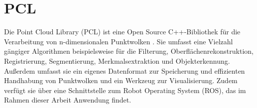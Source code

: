 \section[PCL (Schmelzer)]{PCL}

Die Point Cloud Library (PCL) ist eine Open Source C++-Bibliothek für die Verarbeitung von n-dimensionalen Punktwolken \cite{PCL2020}. Sie umfasst eine Vielzahl gängiger Algorithmen beispielsweise für die Filterung, Oberflächenrekonstruktion, Registrierung, Segmentierung, Merkmalsextraktion und Objekterkennung. Außerdem umfasst sie ein eigenes Datenformat zur Speicherung und effizienten Handhabung von Punktwolken und ein Werkzeug zur Visualisierung. Zudem verfügt sie über eine Schnittstelle zum Robot Operating System (ROS), das im Rahmen dieser Arbeit Anwendung findet. 

